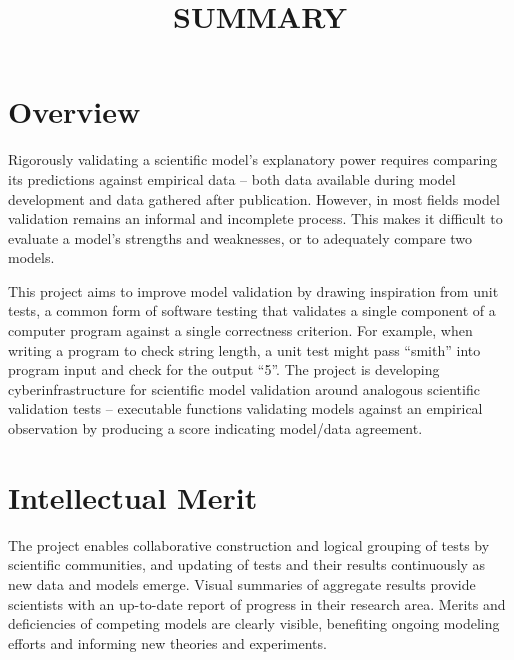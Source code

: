 \documentclass[11pt,letterpaper]{article}
\begin{document}
\title{SUMMARY}

\section{Overview}
Rigorously validating a scientific model’s explanatory power requires comparing its predictions against empirical data -- both data available during model development and data gathered after publication. 
However, in most fields model validation remains an informal and incomplete process. 
This makes it difficult to evaluate a model's strengths and weaknesses, or to adequately compare two models.

This project aims to improve model validation by drawing inspiration from unit tests, a common form of software testing that validates a single component of a computer program against a single correctness criterion. 
For example, when writing a program to check string length, a unit test might pass ``smith'' into program input and check for the output ``5''.   
The project is developing cyberinfrastructure for scientific model validation around analogous scientific validation tests -- 
executable functions validating models against an empirical observation by producing a score indicating model/data agreement. 



\section{Intellectual Merit}
The project enables collaborative construction and logical grouping of tests by scientific communities, and updating of tests and their results continuously as new data and models emerge. 
Visual summaries of aggregate results provide scientists with an up-to-date report of progress in their research area. 
Merits and deficiencies of competing models are clearly visible, benefiting ongoing modeling efforts and informing new theories and experiments.
\end{document}

